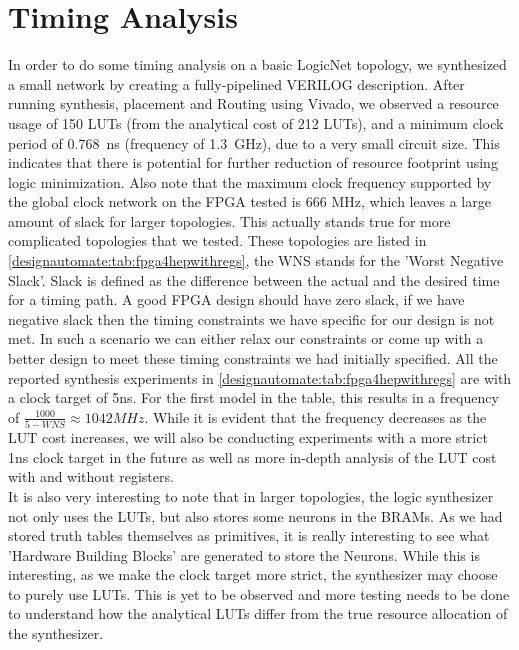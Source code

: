 \section{Timing Analysis}
In order to do some timing analysis on a basic LogicNet topology, we synthesized a small network by creating a fully-pipelined VERILOG description. After running synthesis, placement and Routing using Vivado, we observed a resource usage of 150 LUTs (from the analytical cost of 212 LUTs), and a minimum clock period of $0.768$~ns (frequency of 1.3~GHz), due to a very small circuit size. This indicates that there is potential for further reduction of resource footprint using logic minimization. Also note that the maximum clock frequency supported by the global clock network on the FPGA tested is 666 MHz, which leaves a large amount of slack for larger topologies. This actually stands true for more complicated topologies that we tested. These topologies are listed in \cref{designautomate:tab:fpga4hepwithregs}, the WNS stands for the 'Worst Negative Slack'. Slack is defined as the difference between the actual and the desired time for a timing path. A good FPGA design should have zero slack, if we have negative slack then the timing constraints we have specific for our design is not met. In such a scenario we can either relax our constraints or come up with a better design to meet these timing constraints we had initially specified. All the reported synthesis experiments in \cref{designautomate:tab:fpga4hepwithregs} are with a clock target of 5ns. For the first model in the table, this results in a frequency of $\frac{1000}{5-WNS} \approx 1042 MHz$. While it is evident that the frequency decreases as the LUT cost increases, we will also be conducting experiments with a more strict 1ns clock target in the future as well as more in-depth analysis of the LUT cost with and without registers.\\

It is also very interesting to note that in larger topologies, the logic synthesizer not only uses the LUTs, but also stores some neurons in the BRAMs. As we had stored truth tables themselves as primitives, it is really interesting to see what 'Hardware Building Blocks' are generated to store the Neurons. While this is interesting, as we make the clock target more strict, the synthesizer may choose to purely use LUTs. This is yet to be observed and more testing needs to be done to understand how the analytical LUTs differ from the true resource allocation of the synthesizer. \\


